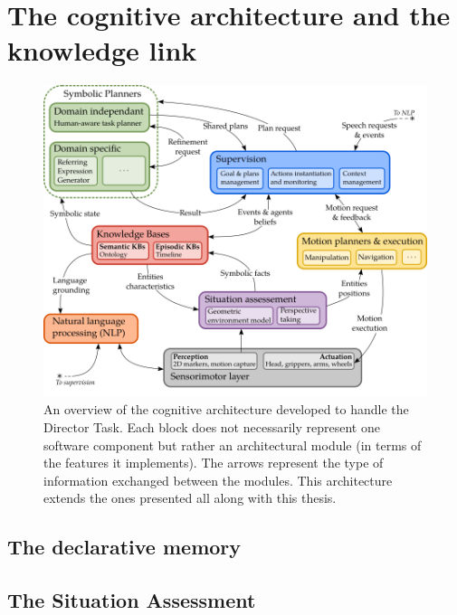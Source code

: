 \section{The cognitive architecture and the knowledge link}

\begin{figure}[ht!]
\centering
\includegraphics[width=\textwidth]{figures/chapter9/architecture.png}
\caption{\label{fig:chap9_architecture} An overview of the cognitive architecture developed to handle the Director Task. Each block does not necessarily represent one software component but rather an architectural module (in terms of the features it implements). The arrows represent the type of information exchanged between the modules. This architecture extends the ones presented all along with this thesis.}
\end{figure}

\subsection{The declarative memory}

\subsection{The Situation Assessment}


